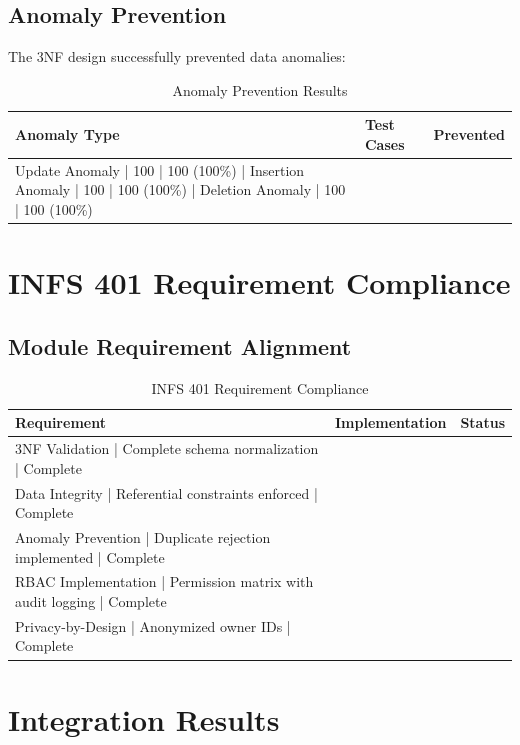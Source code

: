 \subsection{Anomaly Prevention}

The 3NF design successfully prevented data anomalies:

\begin{table}[H]
\centering
\begin{tabular}{|l|l|l|}
\hline
\textbf{Anomaly Type} & \textbf{Test Cases} & \textbf{Prevented} \\
\hline
Update Anomaly | 100 | 100 (100\%) |
Insertion Anomaly | 100 | 100 (100\%) |
Deletion Anomaly | 100 | 100 (100\%) \\
\hline
\end{tabular}
\caption{Anomaly Prevention Results}
\end{table}

\section{INFS 401 Requirement Compliance}

\subsection{Module Requirement Alignment}

\begin{table}[H]
\centering
\begin{tabular}{|l|l|l|}
\hline
\textbf{Requirement} & \textbf{Implementation} & \textbf{Status} \\
\hline
3NF Validation | Complete schema normalization | Complete \\
Data Integrity | Referential constraints enforced | Complete \\
Anomaly Prevention | Duplicate rejection implemented | Complete \\
RBAC Implementation | Permission matrix with audit logging | Complete \\
Privacy-by-Design | Anonymized owner IDs | Complete \\
\hline
\end{tabular}
\caption{INFS 401 Requirement Compliance}
\end{table}

\section{Integration Results}

